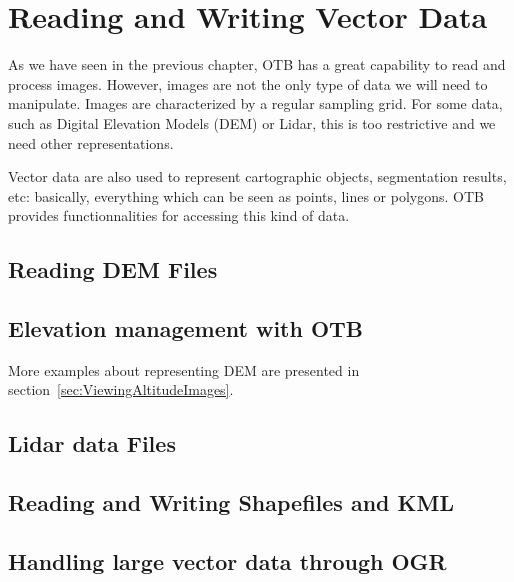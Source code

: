 \chapter{Reading and Writing Vector Data}
\label{sec:ReadingVectorData}

As we have seen in the previous chapter, OTB has a great capability to
read and process images. However, images are not the only type of data
we will need to manipulate. Images are characterized by a regular
sampling grid. For some data, such as Digital Elevation Models (DEM)
or Lidar, this is too restrictive and we need other representations.

Vector data are also used to represent cartographic objects,
segmentation results, etc: basically, everything which can be seen as
points, lines or polygons. OTB provides functionnalities for accessing
this kind of data.

\section{Reading DEM Files}
\label{sec:ReadDEM}


\section{Elevation management with OTB}
\ifitkFullVersion
\label{sec:DEMHandler}
\fi


More examples about representing DEM are presented in section~\ref{sec:ViewingAltitudeImages}.

\section{Lidar data Files}
\label{sec:ReadLidar}



\section{Reading and Writing Shapefiles and KML}
\label{sec:ReadVectorData}


\section{Handling large vector data through OGR}
\label{sec:OGRWrappers}


% 
